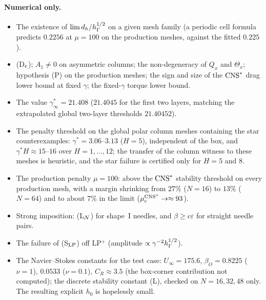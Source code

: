 \paragraph{Numerical only.}
\begin{itemize}
\item The existence of $\lim d_h/h_\Gamma^{1/2}$ on a given mesh family (a periodic cell formula predicts $0.2256$ at $\mu=100$ on the production meshes, against the fitted $0.225$).
\item (D$_{\rm c}$); $A_1\ne0$ on asymmetric columns; the non-degeneracy of $Q_x$ and $\Theta_x$; hypothesis (P) on the production meshes; the sign and size of the $\mathrm{CNS}^\ast$ drag lower bound at fixed $\gamma$; the fixed-$\gamma$ torque lower bound.
\item The value $\gamma^\ast_\infty=21.408$ ($21.4045$ for the first two layers, matching the extrapolated global two-layer thresholds $21.40452$).
\item The penalty threshold on the global polar column meshes containing the star counterexamples: $\gamma^\ast=3.06$--$3.13$ ($H=5$), independent of the box, and $\gamma^\ast H\approx15$--$16$ over $H=1,\dots,12$; the transfer of the column witness to these meshes is heuristic, and the star failure is certified only for $H=5$ and $8$.
\item The production penalty $\mu=100$: above the $\mathrm{CNS}^\ast$ stability threshold on every production mesh, with a margin shrinking from $27\%$ ($N=16$) to $13\%$ ($N=64$) and to about $7\%$ in the limit ($\mu_c^{\mathrm{CNS}^\ast}\to\approx93$).
\item Strong imposition: (L$_\mathcal N$) for shape~I needles, and $\beta\ge c\varepsilon$ for straight needle pairs.
\item The failure of (S$_{\rm LP}$) off LP$^+$ (amplitude $\propto\gamma^{-2}h_\Gamma^{1/2}$).
\item The Navier--Stokes constants for the test case: $U_\infty=175.6$, $\beta_O=0.8225$ ($\nu=1$), $0.0533$ ($\nu=0.1$), $C_R\approx3.5$ (the box-corner contribution not computed); the discrete stability constant (L), checked on $N=16,32,48$ only. The resulting explicit $h_0$ is hopelessly small.
\end{itemize}

